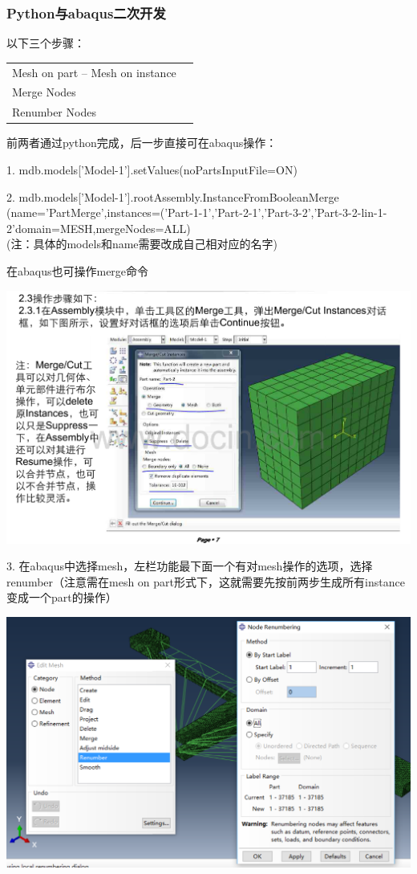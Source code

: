 \documentclass[UTF8]{ctexbook}
\begin{document}
\subsubsection{Python与abaqus二次开发}
以下三个步骤：
\begin{center}
\begin{tabular}{ll}
Mesh on part -- Mesh on instance\\
Merge Nodes\\
Renumber Nodes\\
\end{tabular}
\end{center}

前两者通过python完成，后一步直接可在abaqus操作：

1. mdb.models['Model-1'].setValues(noPartsInputFile=ON)

2. mdb.models['Model-1'].rootAssembly.InstanceFromBooleanMerge\\(name='PartMerge',instances=('Part-1-1','Part-2-1','Part-3-2','Part-3-2-lin-1-2'domain=MESH,mergeNodes=ALL)\\
(注：具体的models和name需要改成自己相对应的名字)

在abaqus也可操作merge命令

\begin{center}
\includegraphics[width=\textwidth]{pre03.png}
\end{center}

3. 在abaqus中选择mesh，左栏功能最下面一个有对mesh操作的选项，选择renumber（注意需在mesh on part形式下，这就需要先按前两步生成所有instance变成一个part的操作）
\begin{center}
\includegraphics[width=\textwidth]{pre04.png}
\end{center}
\end{document}
